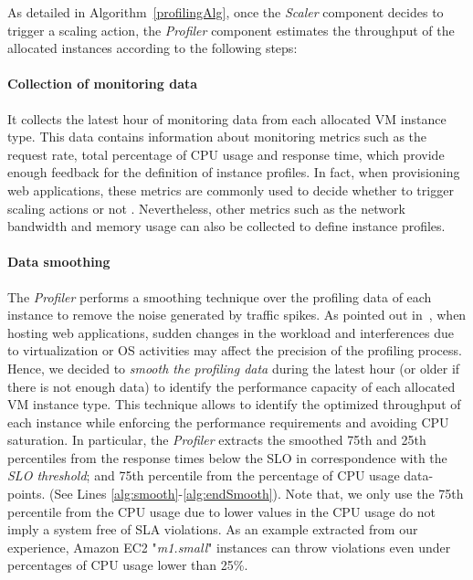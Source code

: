 As detailed in Algorithm~\ref{profilingAlg}, once the \emph{Scaler} component decides to trigger a scaling action, the \emph{Profiler} component estimates the throughput of the allocated instances according to the following steps:



\paragraph{Collection of monitoring data} It collects the latest hour of monitoring data from each allocated VM instance type. This data contains information about monitoring metrics such as the request rate, total percentage of CPU usage and response time, which provide enough feedback for the definition of instance profiles. In fact, when provisioning web applications, these metrics are commonly used to decide whether to trigger scaling actions or not \cite{urgaonkar_agile_2008,smartscale_2012}. Nevertheless, other metrics such as the network bandwidth and memory usage can also be collected to define instance profiles.


\paragraph{Data smoothing} The \emph{Profiler} performs a smoothing technique over the profiling data of each instance to remove the noise generated by traffic spikes. As pointed out in~\cite{gandhi_hybrid_2012}, when hosting web applications, sudden changes in the workload and interferences due to virtualization or OS activities may affect the precision of the profiling process. Hence, we decided to \emph{smooth the profiling data} during the latest hour (or older if there is not enough data) to identify the performance capacity of each allocated VM instance type. This technique allows to identify the optimized throughput of each instance while enforcing the performance requirements and avoiding CPU saturation. In particular, the \emph{Profiler} extracts the smoothed 75th and 25th percentiles from the response times below the SLO in correspondence with the \emph{SLO threshold}; and 75th percentile from the percentage of CPU usage data-points. (See Lines \ref{alg:smooth}-\ref{alg:endSmooth}). Note that, we only use the 75th percentile from the CPU usage due to lower values in the CPU usage do not imply a system free of SLA violations. As an example extracted from our experience, Amazon EC2 "\emph{m1.small}" instances can throw violations even under percentages of CPU usage lower than 25\%. 

